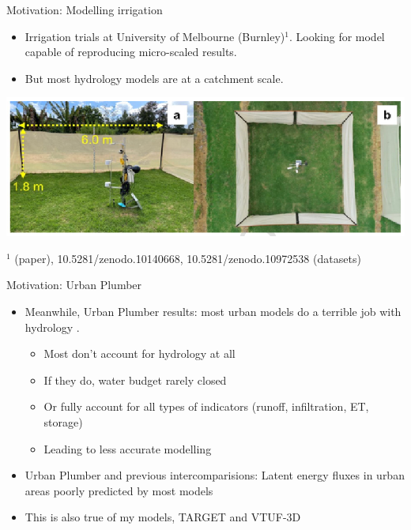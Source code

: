 \documentclass{beamer}
\begin{document}
%


\begin{frame}{Motivation: Modelling irrigation} 

\begin{itemize}
\item Irrigation trials at University of Melbourne (Burnley)$^{1}$. Looking for model capable of reproducing micro-scaled results.\\ 
\item But most hydrology models are at a catchment scale.
\end{itemize}
\begin{center}
\includegraphics[scale=0.60]{Screenshot_20250703_100546.png}
\end{center}
$^{1}${\footnotesize \cite{Cheung2024} (paper), 10.5281/zenodo.10140668, 10.5281/zenodo.10972538 (datasets)}
\end{frame}






\begin{frame}{Motivation: Urban Plumber} 
\begin{itemize}

\item Meanwhile, Urban Plumber results: most urban models do a terrible job with hydrology {\footnotesize \citep{jongen_water_2024}}.
\begin{itemize}
\item Most don't account for hydrology at all
\item If they do, water budget rarely closed
\item Or fully account for all types of indicators (runoff, infiltration, ET, storage)
\item Leading to less accurate modelling
\end{itemize}
\item Urban Plumber and previous intercomparisions: Latent energy fluxes in urban areas poorly predicted by most models {\footnotesize \citep{lipson_evaluation_2024,grimmond_initial_2011}}
\item This is also true of my models, TARGET and VTUF-3D
\end{itemize}
\end{frame}
\end{document}

